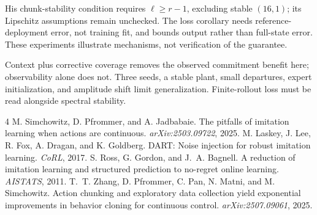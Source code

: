 \documentclass{l4dc2026}
\begin{document}
His chunk-stability condition requires $\ell\ge r-1$, excluding stable $(16,1)$; its Lipschitz assumptions remain unchecked. The loss corollary needs reference-deployment error, not training fit, and bounds output rather than full-state error. These experiments illustrate mechanisms, not verification of the guarantee.

Context plus corrective coverage removes the observed commitment benefit here; observability alone does not. Three seeds, a stable plant, small departures, expert initialization, and amplitude shift limit generalization. Finite-rollout loss must be read alongside spectral stability.

\footnotesize
\begin{thebibliography}{4}\setlength{\itemsep}{0pt}
M. Simchowitz, D. Pfrommer, and A. Jadbabaie.
The pitfalls of imitation learning when actions are continuous.
\emph{arXiv:2503.09722}, 2025.
M. Laskey, J. Lee, R. Fox, A. Dragan, and K. Goldberg.
DART: Noise injection for robust imitation learning. \emph{CoRL}, 2017.
S. Ross, G. Gordon, and J.~A. Bagnell.
A reduction of imitation learning and structured prediction to no-regret online learning. \emph{AISTATS}, 2011.
T.~T. Zhang, D. Pfrommer, C. Pan, N. Matni, and M. Simchowitz.
Action chunking and exploratory data collection yield exponential improvements in behavior cloning for continuous control. \emph{arXiv:2507.09061}, 2025.
\end{thebibliography}
\end{document}
